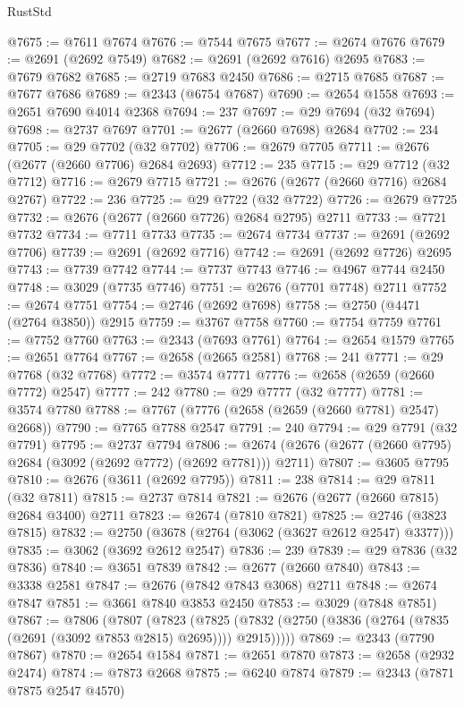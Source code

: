 \begin{lexlean}{RustStd}
\begin{coremodule}
@7675 := @7611 @7674
@7676 := @7544 @7675
@7677 := @2674 @7676
@7679 := @2691 (@2692 @7549)
@7682 := @2691 (@2692 @7616) @2695
@7683 := @7679 @7682
@7685 := @2719 @7683 @2450
@7686 := @2715 @7685
@7687 := @7677 @7686
@7689 := @2343 (@6754 @7687)
@7690 := @2654 @1558
@7693 := @2651 @7690 @4014 @2368
@7694 := 237
@7697 := @29 @7694 (@32 @7694)
@7698 := @2737 @7697
@7701 := @2677 (@2660 @7698) @2684
@7702 := 234
@7705 := @29 @7702 (@32 @7702)
@7706 := @2679 @7705
@7711 := @2676 (@2677 (@2660 @7706) @2684 @2693)
@7712 := 235
@7715 := @29 @7712 (@32 @7712)
@7716 := @2679 @7715
@7721 := @2676 (@2677 (@2660 @7716) @2684 @2767)
@7722 := 236
@7725 := @29 @7722 (@32 @7722)
@7726 := @2679 @7725
@7732 := @2676 (@2677 (@2660 @7726) @2684 @2795) @2711
@7733 := @7721 @7732
@7734 := @7711 @7733
@7735 := @2674 @7734
@7737 := @2691 (@2692 @7706)
@7739 := @2691 (@2692 @7716)
@7742 := @2691 (@2692 @7726) @2695
@7743 := @7739 @7742
@7744 := @7737 @7743
@7746 := @4967 @7744 @2450
@7748 := @3029 (@7735 @7746)
@7751 := @2676 (@7701 @7748) @2711
@7752 := @2674 @7751
@7754 := @2746 (@2692 @7698)
@7758 := @2750 (@4471 (@2764 @3850)) @2915
@7759 := @3767 @7758
@7760 := @7754 @7759
@7761 := @7752 @7760
@7763 := @2343 (@7693 @7761)
@7764 := @2654 @1579
@7765 := @2651 @7764
@7767 := @2658 (@2665 @2581)
@7768 := 241
@7771 := @29 @7768 (@32 @7768)
@7772 := @3574 @7771
@7776 := @2658 (@2659 (@2660 @7772) @2547)
@7777 := 242
@7780 := @29 @7777 (@32 @7777)
@7781 := @3574 @7780
@7788 := @7767 (@7776 (@2658 (@2659 (@2660 @7781) @2547) @2668))
@7790 := @7765 @7788 @2547
@7791 := 240
@7794 := @29 @7791 (@32 @7791)
@7795 := @2737 @7794
@7806 := @2674 (@2676 (@2677 (@2660 @7795) @2684 (@3092 (@2692 @7772) (@2692 @7781))) @2711)
@7807 := @3605 @7795
@7810 := @2676 (@3611 (@2692 @7795))
@7811 := 238
@7814 := @29 @7811 (@32 @7811)
@7815 := @2737 @7814
@7821 := @2676 (@2677 (@2660 @7815) @2684 @3400) @2711
@7823 := @2674 (@7810 @7821)
@7825 := @2746 (@3823 @7815)
@7832 := @2750 (@3678 (@2764 (@3062 (@3627 @2612 @2547) @3377)))
@7835 := @3062 (@3692 @2612 @2547)
@7836 := 239
@7839 := @29 @7836 (@32 @7836)
@7840 := @3651 @7839
@7842 := @2677 (@2660 @7840)
@7843 := @3338 @2581
@7847 := @2676 (@7842 @7843 @3068) @2711
@7848 := @2674 @7847
@7851 := @3661 @7840 @3853 @2450
@7853 := @3029 (@7848 @7851)
@7867 := @7806
    (@7807
      (@7823
        (@7825 (@7832 (@2750 (@3836 (@2764 (@7835 (@2691 (@3092 @7853 @2815) @2695)))) @2915)))))
@7869 := @2343 (@7790 @7867)
@7870 := @2654 @1584
@7871 := @2651 @7870
@7873 := @2658 (@2932 @2474)
@7874 := @7873 @2668
@7875 := @6240 @7874
@7879 := @2343 (@7871 @7875 @2547 @4570)

\end{coremodule}
\end{lexlean}
